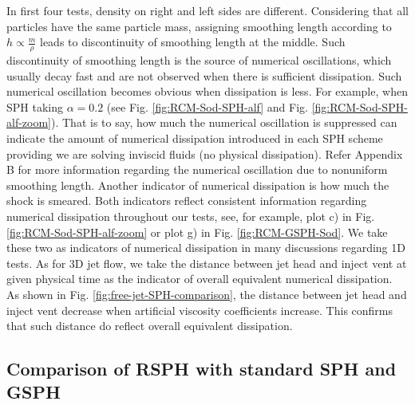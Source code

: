 \documentclass[preprint,12pt,authoryear]{elsarticle}
\begin{document}
In first four tests, density on right and left sides are different. Considering that all particles have the same particle mass, assigning smoothing length according to $h \propto \frac{m}{\rho}$ leads to discontinuity of smoothing length at the middle. Such discontinuity of smoothing length is the source of numerical oscillations, which usually decay fast and are not observed when there is sufficient dissipation. 
Such numerical oscillation becomes obvious when dissipation is less. For example, when SPH taking $\alpha=0.2$ (see Fig. \ref{fig:RCM-Sod-SPH-alf} and Fig. \ref{fig:RCM-Sod-SPH-alf-zoom}). That is to say, how much the numerical oscillation is suppressed can indicate the amount of numerical dissipation introduced in each SPH scheme providing we are solving inviscid fluids (no physical dissipation). Refer Appendix B for more information regarding the numerical oscillation due to nonuniform smoothing length.
Another indicator of numerical dissipation is how much the shock is smeared. Both indicators reflect consistent information regarding numerical dissipation throughout our tests, see, for example, plot c) in Fig. \ref{fig:RCM-Sod-SPH-alf-zoom} or plot g) in Fig. \ref{fig:RCM-GSPH-Sod}. 
We take these two as indicators of numerical dissipation in many discussions regarding 1D tests.
As for 3D jet flow, we take the distance between jet head and inject vent at given physical time as the indicator of overall equivalent numerical dissipation. As shown in Fig. \ref{fig:free-jet-SPH-comparison}, the distance between jet head and inject vent decrease when artificial viscosity coefficients increase. This confirms that such distance do reflect overall equivalent dissipation.

\subsection{Comparison of RSPH with standard SPH and GSPH}
\end{document}
